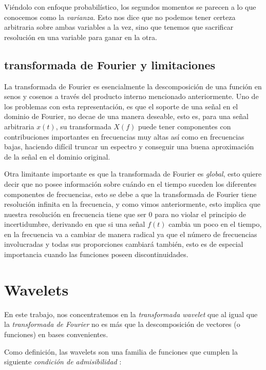 \documentclass[conference]{IEEEtran}
\begin{document}
Viéndolo con enfoque probabilístico, los segundos momentos se parecen a lo que conocemos como la \emph{varianza}. Esto nos dice que no podemos tener certeza arbitraria sobre ambas variables a la vez, sino que tenemos que sacrificar resolución en una variable para ganar en la otra.



\subsection{transformada de Fourier y limitaciones}

La transformada de Fourier es esencialmente la descomposición de una función en senos y cosenos a través del producto interno mencionado anteriormente. Uno de los problemas con esta representación, es que el soporte de una señal en el dominio de Fourier, no decae de una manera deseable, esto es, para una señal arbitraria $x(t)$, su transformada $X(f)$ puede tener componentes con contribuciones importantes en frecuencias muy altas así como en frecuencias bajas, haciendo difícil truncar un espectro y conseguir una buena aproximación de la señal en el dominio original.

Otra limitante importante es que la transformada de Fourier es \emph{global}, esto quiere decir que no posee información sobre cuándo en el tiempo suceden los diferentes componentes de frecuencias, esto se debe a que la transformada de Fourier tiene resolución infinita en la frecuencia, y como vimos anteriormente, esto implica que nuestra resolución en frecuencia tiene que ser 0 para no violar el principio de incertidumbre, derivando en que si una señal $f(t)$ cambia un poco en el tiempo, en la frecuencia va a cambiar de manera radical ya que el número de frecuencias involucradas y todas sus proporciones cambiará también, esto es de especial importancia cuando las funciones poseen discontinuidades.


\section{Wavelets}

En este trabajo, nos concentratemos en la \emph{transformada wavelet} que al igual que la \emph{transformada de Fourier} no es más que la descomposición de vectores (o funciones) en bases convenientes.

Como definición, las wavelets son una familia de funciones que cumplen la siguiente \emph{condición de admisibilidad}   \cite{turbulence}:
\end{document}
